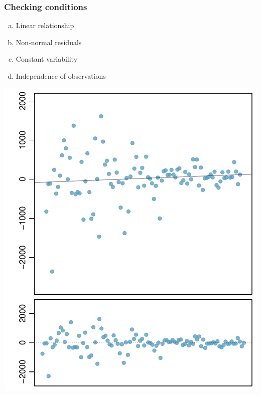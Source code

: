 \documentclass[11pt,containsverbatim,handout,xcolor=xelatex,dvipsnames,table]{beamer}
\newcommand{\solnMult}[1]{#1}
\begin{document}
\begin{frame}
\frametitle{Checking conditions}

{
\begin{enumerate}[(a)]
\item Linear relationship
\item Non-normal residuals
\item \solnMult{Constant variability}
\item Independence of observations
\end{enumerate}
}
{
\begin{center}
\includegraphics[width=\textwidth]{figures/problems/heteroscedastic}
\end{center}
}

\end{frame}

\end{document}
